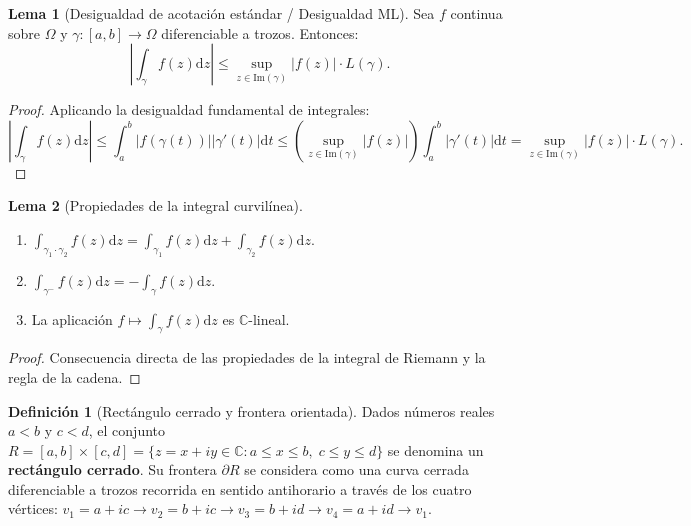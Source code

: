 \documentclass[11pt,a4paper]{article}
\theoremstyle{definition}
\newtheorem{definicion}{Definición}[section]
\newtheorem{lema}{Lema}[section]
\theoremstyle{remark}
\numberwithin{equation}{section}
\newcommand{\dz}{\mathrm{d}z}
\newcommand{\dt}{\mathrm{d}t}
\begin{document}
\begin{lema}[Desigualdad de acotación estándar / Desigualdad ML]
Sea $f$ continua sobre $\Omega$ y $\gamma: [a,b] \to \Omega$ diferenciable a trozos. Entonces:
\begin{equation}
\left| \int_\gamma f(z) \dz \right| \le \sup_{z \in \mathrm{Im}(\gamma)} |f(z)| \cdot L(\gamma).
\end{equation}
\end{lema}
\begin{proof}
Aplicando la desigualdad fundamental de integrales:
\[
\left| \int_\gamma f(z) \dz \right| \le \int_a^b |f(\gamma(t))| |\gamma'(t)| \dt \le \left(\sup_{z \in \mathrm{Im}(\gamma)} |f(z)|\right) \int_a^b |\gamma'(t)| \dt = \sup_{z \in \mathrm{Im}(\gamma)} |f(z)| \cdot L(\gamma).
\]
\end{proof}

\begin{lema}[Propiedades de la integral curvilínea]
\begin{enumerate}
\item $\int_{\gamma_1 \cdot \gamma_2} f(z) \dz = \int_{\gamma_1} f(z) \dz + \int_{\gamma_2} f(z) \dz$.
\item $\int_{\gamma^-} f(z) \dz = - \int_\gamma f(z) \dz$.
\item La aplicación $f \mapsto \int_\gamma f(z) \dz$ es $\mathbb{C}$-lineal.
\end{enumerate}
\end{lema}
\begin{proof}
Consecuencia directa de las propiedades de la integral de Riemann y la regla de la cadena.
\end{proof}

\begin{definicion}[Rectángulo cerrado y frontera orientada]
Dados números reales $a < b$ y $c < d$, el conjunto $R = [a,b] \times [c,d] = \{z = x+iy \in \mathbb{C} : a \le x \le b, \; c \le y \le d\}$ se denomina un \textbf{rectángulo cerrado}. Su frontera $\partial R$ se considera como una curva cerrada diferenciable a trozos recorrida en sentido antihorario a través de los cuatro vértices: $v_1 = a+ic \to v_2 = b+ic \to v_3 = b+id \to v_4 = a+id \to v_1$.
\end{definicion}
\end{document}
